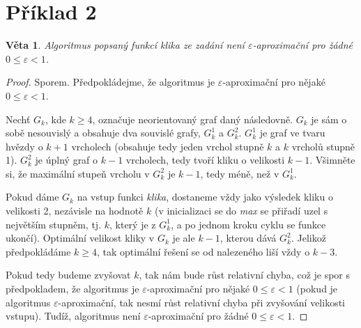 \documentclass[10pt,a4paper]{article}
\newtheorem{theorem}{Věta}
\newcommand{\eps}{\varepsilon} %
\begin{document}
\section*{Příklad 2}

\begin{theorem}
\label{theorem:Ex2}
	Algoritmus popsaný funkcí \emph{klika} ze zadání není $\eps$-aproximační pro žádné $0 \leq \eps < 1$.
\end{theorem}

\begin{proof}
	Sporem. Předpokládejme, že algoritmus je $\eps$-aproximační pro nějaké $0 \leq \eps < 1$.

	Nechť $G_{k}$, kde $k \geq 4$, označuje neorientovaný graf daný následovně. $G_{k}$ je sám o sobě nesouvislý a obsahuje dva souvislé grafy, $G_{k}^{1}$ a $G_{k}^{2}$. $G_{k}^{1}$ je graf ve tvaru hvězdy o $k + 1$ vrcholech (obsahuje tedy jeden vrchol stupně $k$ a $k$ vrcholů stupně 1). $G_{k}^{2}$ je úplný graf o $k - 1$ vrcholech, tedy tvoří kliku o velikosti $k - 1$. Všimněte si, že maximální stupeň vrcholu v $G_{k}^{2}$ je $k - 1$, tedy méně, než v $G_{k}^{1}$.

	Pokud dáme $G_{k}$ na vstup funkci \emph{klika}, dostaneme vždy jako výsledek kliku o velikosti 2, nezávisle na hodnotě $k$ (v inicializaci se do \emph{max} se přiřadí uzel s největším stupněm, tj. $k$, který je z $G_{k}^{1}$, a po jednom kroku cyklu se funkce ukončí). Optimální velikost kliky v $G_{k}$ je ale $k - 1$, kterou dává $G_{k}^{2}$. Jelikož předpokládáme $k \geq 4$, tak optimální řešení se od nalezeného liší vždy o $k - 3$.

	Pokud tedy budeme zvyšovat $k$, tak nám bude růst relativní chyba, což je spor s předpokladem, že algoritmus je $\eps$-aproximační pro nějaké $0 \leq \eps < 1$ (pokud je algoritmus $\eps$-aproximační, tak nesmí růst relativní chyba při zvyšování velikosti vstupu). Tudíž, algoritmus není $\eps$-aproximační pro žádné $0 \leq \eps < 1$.
\end{proof}
\end{document}
